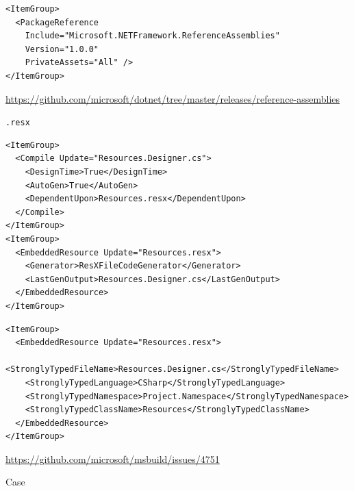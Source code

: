 \documentclass[utf8x]{beamer}
\begin{document}
\begin{frame}[fragile]
\begin{center}
\begin{verbatim}
<ItemGroup>
  <PackageReference
    Include="Microsoft.NETFramework.ReferenceAssemblies"
    Version="1.0.0"
    PrivateAssets="All" />
</ItemGroup>
\end{verbatim}
\tiny\url{https://github.com/microsoft/dotnet/tree/master/releases/reference-assemblies}
\end{center}
\end{frame}


\begin{frame}
    \begin{center}
        \LARGE \texttt{.resx}
    \end{center}
\end{frame}

\begin{frame}[fragile]
\begin{center}
\begin{verbatim}
<ItemGroup>
  <Compile Update="Resources.Designer.cs">
    <DesignTime>True</DesignTime>
    <AutoGen>True</AutoGen>
    <DependentUpon>Resources.resx</DependentUpon>
  </Compile>
</ItemGroup>
<ItemGroup>
  <EmbeddedResource Update="Resources.resx">
    <Generator>ResXFileCodeGenerator</Generator>
    <LastGenOutput>Resources.Designer.cs</LastGenOutput>
  </EmbeddedResource>
</ItemGroup>
\end{verbatim}
\end{center}
\end{frame}

\begin{frame}[fragile]
\begin{center}
\begin{verbatim}
<ItemGroup>
  <EmbeddedResource Update="Resources.resx">
    <StronglyTypedFileName>Resources.Designer.cs</StronglyTypedFileName>
    <StronglyTypedLanguage>CSharp</StronglyTypedLanguage>
    <StronglyTypedNamespace>Project.Namespace</StronglyTypedNamespace>
    <StronglyTypedClassName>Resources</StronglyTypedClassName>
  </EmbeddedResource>
</ItemGroup>
\end{verbatim}
\tiny\url{https://github.com/microsoft/msbuild/issues/4751}
\end{center}
\end{frame}


\begin{frame}
    \begin{center}
        \LARGE \textrm{Case}
    \end{center}
\end{frame}
\end{document}
